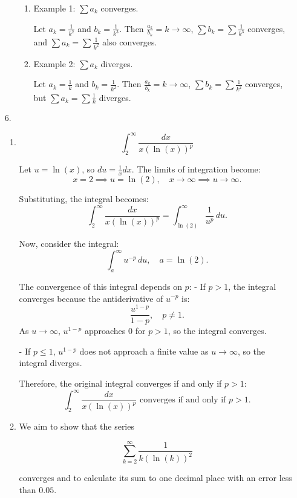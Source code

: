 \documentclass[12pt]{article}
\begin{document}
\begin{enumerate}
\begin{enumerate}
    \begin{enumerate}
        \item Example 1: $\sum a_k$ converges.

        Let $a_k = \frac{1}{k^2}$ and $b_k = \frac{1}{k^3}$. Then $\frac{a_k}{b_k} = k \to \infty$, $\sum b_k = \sum \frac{1}{k^3}$ converges, and $\sum a_k = \sum \frac{1}{k^2}$ also converges.

        \item Example 2: $\sum a_k$ diverges.

        Let $a_k = \frac{1}{k}$ and $b_k = \frac{1}{k^2}$. Then $\frac{a_k}{b_k} = k \to \infty$, $\sum b_k = \sum \frac{1}{k^2}$ converges, but $\sum a_k = \sum \frac{1}{k}$ diverges.
    \end{enumerate}
\end{enumerate}

\item [6.]
\begin{enumerate}
    \item 
    \[
\int_2^\infty \frac{dx}{x(\ln(x))^p}
\]

Let \( u = \ln(x) \), so \( du = \frac{1}{x}dx \). The limits of integration become:
\[
x = 2 \implies u = \ln(2), \quad x \to \infty \implies u \to \infty.
\]

Substituting, the integral becomes:
\[
\int_2^\infty \frac{dx}{x(\ln(x))^p} = \int_{\ln(2)}^\infty \frac{1}{u^p} \, du.
\]

Now, consider the integral:
\[
\int_a^\infty u^{-p} \, du, \quad a = \ln(2).
\]

The convergence of this integral depends on \( p \):
- If \( p > 1 \), the integral converges because the antiderivative of \( u^{-p} \) is:
\[
\frac{u^{1-p}}{1-p}, \quad p \neq 1.
\]
As \( u \to \infty \), \( u^{1-p} \) approaches 0 for \( p > 1 \), so the integral converges.

- If \( p \leq 1 \), \( u^{1-p} \) does not approach a finite value as \( u \to \infty \), so the integral diverges.

Therefore, the original integral converges if and only if \( p > 1 \):
\[
\int_2^\infty \frac{dx}{x(\ln(x))^p} \text{ converges if and only if } p > 1.
\]

\item 
We aim to show that the series 

\[
\sum_{k=2}^\infty \frac{1}{k (\ln(k))^2}
\]

converges and to calculate its sum to one decimal place with an error less than \(0.05\).


\end{enumerate}
\end{enumerate}
\end{document}
